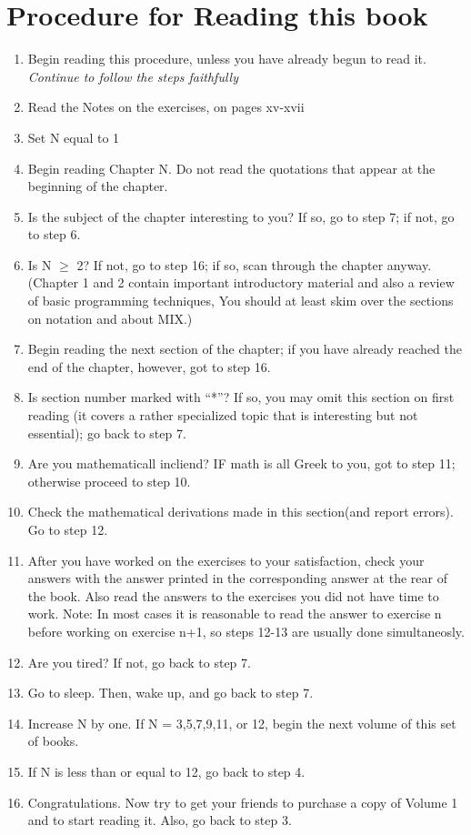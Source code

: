 \documentclass{article}
\begin{document}
\section{Procedure for Reading this book}
\begin{enumerate}
    \item Begin reading this procedure, unless you have already begun to read it. \textit{Continue to follow the steps faithfully}
    \item Read the Notes on the exercises, on pages xv-xvii
    \item Set N equal to 1
    \item Begin reading Chapter N. Do not read the quotations that appear at the beginning of the chapter.
    \item Is the subject of the chapter interesting to you? If so, go to step 7; if not, go to step 6.
    \item Is N $\geq$ 2? If not, go to step 16; if so, scan through the chapter anyway. (Chapter 1 and 2 contain important introductory material and also a review of basic programming techniques, You should at least skim over the sections on notation and about MIX.)
    \item Begin reading the next section of the chapter; if you have already reached the end of the chapter, however, got to step 16.
    \item Is section number marked with ``*''? If so, you may omit this section on first reading (it covers a rather specialized topic that is interesting but not essential); go back to step 7.
    \item Are you mathematicall incliend? IF math is all Greek to you, got to step 11; otherwise proceed to step 10.
    \item Check the mathematical derivations made in this section(and report errors). Go to step 12.
    \item After you have worked on the exercises to your satisfaction, check your answers with the answer printed in the corresponding answer at the rear of the book. Also read the answers to the exercises you did not have time to work. Note: In most cases it is reasonable to read the answer to exercise n before working on exercise n+1, so steps 12-13 are usually done simultaneosly.
    \item Are you tired? If not, go back to step 7.
    \item Go to sleep. Then, wake up, and go back to step 7.
    \item Increase N by one. If N = 3,5,7,9,11, or 12, begin the next volume of this set of books.
    \item If N is less than or equal to 12, go back to step 4.
    \item Congratulations. Now try to get your friends to purchase a copy of Volume 1 and to start reading it. Also, go back to step 3.
\end{enumerate}
\end{document}

